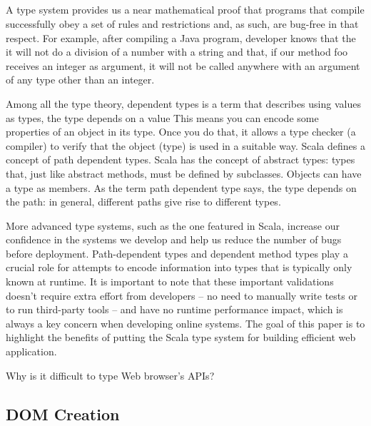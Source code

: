 \documentclass[runningheads,a4paper]{llncs}
\begin{document}
\subsection{}

A type system provides us a near mathematical proof that programs that compile successfully obey a set of rules and restrictions and, as such, are bug-free in that respect. For example, after compiling a Java program, developer knows that the it will not do a division of a number with a string and that, if our method foo receives an integer as argument, it will not be called anywhere with an argument of any type other than an integer.

Among all the type theory,  dependent types is a term that describes using values as types,  the type depends on a value  This means you can encode some properties of an object in its type. Once you do that, it allows a type checker (a compiler) to verify that the object (type) is used in a suitable way. Scala defines a concept of path dependent types. Scala has the concept of abstract types: types that, just like abstract methods, must be defined by subclasses. Objects can have a type as members. As the term path dependent type says, the type depends on the path: in general, different paths give rise to different types. 
	

	

More advanced type systems, such as the one featured in Scala, increase our confidence in the systems we develop and help us reduce the number of bugs before deployment. Path-dependent types and dependent method types play a crucial role for attempts to encode information into types that is typically only known at runtime. It is important to note that these important validations doesn't require extra effort from developers – no need to manually write tests or to run third-party tools – and have no runtime performance impact, which is always a key concern when developing online systems. The goal of this paper is to highlight the benefits of putting the Scala type system for building efficient web application. 



Why is it difficult to type Web browser’s APIs?

\subsection{DOM Creation}
\end{document}

